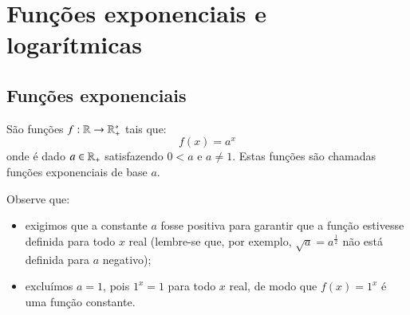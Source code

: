 \chapter{Funções exponenciais e logarítmicas}
 \section{Funções exponenciais}

  \colorbox{azul}{
 \begin{minipage}{0.9\linewidth}
 \begin{center}
 São funções $f: \mathbb{R} \rightarrow \mathbb{R}_{+}^{*} $ tais que:
 \[f(x) = a^x\]
 onde é dado $a \in \mathbb{R}_{+}$ satisfazendo $0 < a$ e $a \neq 1$. Estas funções são chamadas funções exponenciais de base $a$.
 \end{center}
 \end{minipage}}
 \vskip0.3cm

 Observe que:
 \begin{itemize}
  \item exigimos que a constante $a$ fosse positiva para garantir que a função estivesse definida para todo $x$ real (lembre-se que, por exemplo, $\sqrt{a}= a^{\frac{1}{2}}$ não está definida para $a$ negativo);
  \item excluímos $a=1$, pois $1^x=1$ para todo $x$ real, de modo que $f(x)= 1^x$ é uma função constante.
 \end{itemize}


